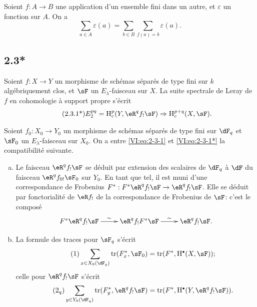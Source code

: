 Soient $f:A\to B$ une application d'un ensemble fini dans un autre, et 
$\varepsilon$ un fonction sur $A$. On a 
\begin{equation*}\tag{2.3.1}\label{VI:eq:2-3-1}
  \sum_{a\in A} \varepsilon(a) = \sum_{b\in B} \sum_{f(a)=b} \varepsilon(a) \text{.}
\end{equation*}





\subsection*{2.3*}\label{VI:2-3*}

Soient $f:X\to Y$ un morphisme de schémas séparés de type fini sur $k$ 
algébriquement clos, et $\sF$ un $E_\lambda$-faisceau sur $X$. La suite 
spectrale de Leray de $f$ en cohomologie à support propre s'écrit 
\begin{align*}\tag{2.3.1*}\label{VI:eq:2-3-1*}
  E_2^{p q} = \h_c^p(Y,\eR^q f_! \sF) \Rightarrow \h_c^{p+q}(X,\sF) \text{.}
\end{align*}

Soient $f_0:X_0 \to Y_0$ un morphisme de schémas séparés de type fini sur 
$\dF_q$ et $\sF_0$ un $E_\lambda$-faisceau sur $X_0$. On a entre 
\eqref{VI:eq:2-3-1} et \eqref{VI:eq:2-3-1*} la compatibilité suivante. 

\begin{enumerate}[a)]
  \item Le faisceau $\eR^q f_! \sF$ se déduit par extension des scalaires de 
    $\dF_q$ à $\dF$ du faisceau $\eR^q f_{0!} \sF_0$ sur $Y_0$. En tant que 
    tel, il est muni d'une correspondance de Frobenius 
    $F^\ast:F^\ast\eR^q f_! \sF \to \eR^q f_! \sF$. Elle se déduit par 
    fonctorialité de $\eR f_!$ de la correspondance de Frobenius de $\sF$: 
    c'est le composé 
    \[\xymatrix{
      F^\ast \eR^q f_! \sF \ar[r]^-\sim 
        & \eR^q f_! F^\ast \sF \ar[r]^-\sim 
        & \eR^q f_! \sF \text{.}
    }\]
  \item La formule des traces pour $\sF_q$ s'écrit 
    \begin{align*}\tag{1}\label{VI:eq:1}
      \sum_{x\in X_0(\dF_q)} \tr(F_x^\ast,\sF_0) = \tr(F^\ast,\h^\bullet(X,\sF)) \text{;}
    \end{align*}
    celle pour $\eR^q f_! \sF$ s'écrit 
    \begin{align*}\tag{2$_q$}\label{VI:eq:2_q} 
      \sum_{y\in Y_0(\dF_q)} \tr(F_y^\ast,\eR^q f_! \sF) = \tr(F^\ast, \h^\bullet(Y,\eR^q f_! \sF)) \text{.}
    \end{align*}
\end{enumerate}

